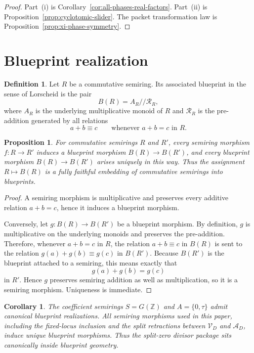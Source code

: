 \documentclass[11pt,a4paper]{article}
\newtheorem{proposition}[theorem]{Proposition}
\newtheorem{corollary}[theorem]{Corollary}
\theoremstyle{definition}
\newtheorem{definition}[theorem]{Definition}
\theoremstyle{remark}
\newcommand{\ZZ}{\mathbb Z}
\newcommand{\taup}{\tau}
\newcommand{\Vd}{\mathcal V_D}
\newcommand{\Ad}{\mathcal A_D}
\begin{document}
\begin{proof}
Part~(i) is Corollary~\ref{cor:all-phases-real-factors}. Part~(ii) is Proposition~\ref{prop:cyclotomic-slider}. The packet transformation law is Proposition~\ref{prop:xi-phase-symmetry}.
\end{proof}

\section{Blueprint realization}\label{sec:blueprints}

\begin{definition}
Let $R$ be a commutative semiring. Its associated blueprint in the sense of Lorscheid is the pair
\[
B(R)=A_R//\mathcal R_R,
\]
where $A_R$ is the underlying multiplicative monoid of $R$ and $\mathcal R_R$ is the pre-addition generated by all relations
\[
a+b\equiv c\qquad\text{whenever }a+b=c\text{ in }R.
\]
\end{definition}

\begin{proposition}\label{prop:blueprint-embedding}
For commutative semirings $R$ and $R'$, every semiring morphism $f:R\to R'$ induces a blueprint morphism $B(R)\to B(R')$, and every blueprint morphism $B(R)\to B(R')$ arises uniquely in this way. Thus the assignment $R\mapsto B(R)$ is a fully faithful embedding of commutative semirings into blueprints.
\end{proposition}

\begin{proof}
A semiring morphism is multiplicative and preserves every additive relation $a+b=c$, hence it induces a blueprint morphism.

Conversely, let $g:B(R)\to B(R')$ be a blueprint morphism. By definition, $g$ is multiplicative on the underlying monoids and preserves the pre-addition. Therefore, whenever $a+b=c$ in $R$, the relation $a+b\equiv c$ in $B(R)$ is sent to the relation $g(a)+g(b)\equiv g(c)$ in $B(R')$. Because $B(R')$ is the blueprint attached to a semiring, this means exactly that
\[
g(a)+g(b)=g(c)
\]
in $R'$. Hence $g$ preserves semiring addition as well as multiplication, so it is a semiring morphism. Uniqueness is immediate.
\end{proof}

\begin{corollary}
The coefficient semirings $S=G(\ZZ)$ and $A=\{0,\taup\}$ admit canonical blueprint realizations. All semiring morphisms used in this paper, including the fixed-locus inclusion and the split retractions between $\Vd$ and $\Ad$, induce unique blueprint morphisms. Thus the split-zero divisor package sits canonically inside blueprint geometry.
\end{corollary}
\end{document}
